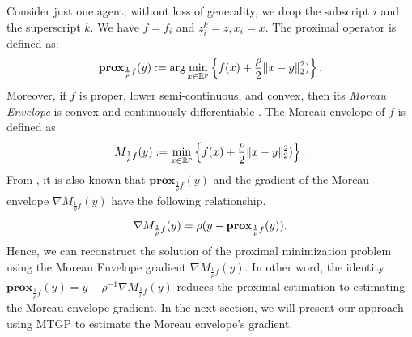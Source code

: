 \documentclass[conference]{IEEEtran}
\newcommand{\AD}[1]{}
\newcommand{\Long}[1]{}
\begin{document}
Consider just one agent; without loss of generality, we drop the subscript $i$ and the superscript $k$. We have $f = f_i$ and $z_i^k = z, x_i = x$. The proximal operator \cite{10.1561/2400000003} is defined as:
\begin{equation}
    \mathbf{prox}_{\frac{1}{\rho}f}(y) := \arg\min_{x \in \mathbb{R}^p} \left \{ f(x) + \frac{\rho}{2}\|x - y\|_2^2) \right \}\text.
    \label{proximal_operator}
\end{equation}
Moreover, if $f$ is proper, lower semi-continuous, and convex, then its \textit{Moreau Envelope} is convex and continuously differentiable \cite{rockafellar1998variational}. The Moreau envelope of $f$ is defined as
\begin{equation}
    M_{\frac{1}{\rho}f}(y) := \min_{x \in \mathbb{R}^p} \left \{ f(x) + \frac{\rho}{2}\|x - y\|_2^2) \right \} \text.
\end{equation}
From \cite{10.1561/2400000003}, it is also known that $\mathbf{prox}_{\frac{1}{\rho}f}(y)$ and the gradient of the Moreau envelope $\nabla M_{\frac{1}{\rho}f}(y)$ have the following relationship.
\begin{equation}
    \nabla M_{\frac{1}{\rho}f}(y) = \rho(y - \mathbf{prox}_{\frac{1}{\rho}f}(y)) \text.
    \label{moreau_grad_prox_relation}
\end{equation}
Hence, we can reconstruct the solution of the proximal minimization problem using the Moreau Envelope gradient $\nabla M_{\frac{1}{\rho}f}(y)$. In other word, the identity $\mathbf{prox}_{\frac{1}{\rho}f}(y) = y - \rho^{-1}\nabla M_{\frac{1}{\rho}f}(y)$ reduces the proximal estimation to estimating the Moreau-envelope gradient. 
In the next section, we will present our approach using MTGP to estimate the Moreau envelope's gradient.

\end{document}
